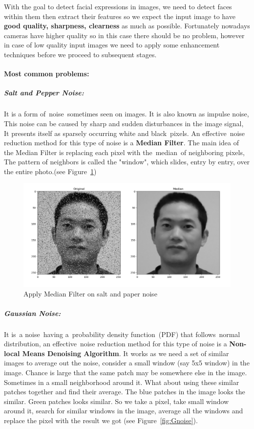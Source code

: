 With the goal to detect facial expressions in images, we need to detect faces within them then extract their features so we expect the input image to have \textbf{good quality, sharpness, clearness} as much as possible.\newline
Fortunately nowadays cameras have higher quality so in this case there should be no problem, however in case of low quality input images we need to apply some enhancement techniques before we proceed to subsequent stages.

\paragraph{Most common problems:}
\subparagraph{Salt and Pepper Noise:}
It is a form of noise sometimes seen on images. It is also known as impulse noise, This noise can be caused by sharp and sudden disturbances in the image signal, It presents itself as sparsely occurring white and black pixels.\newline
An effective noise reduction method for this type of noise is a \textbf{Median Filter}.\newline
The main idea of the Median Filter is  replacing each pixel with the median of neighboring pixels, The pattern of neighbors is called the "window", which slides, entry by entry, over the entire photo.(see Figure~\ref{fig:median})


\begin{figure}[H]
	\centering
	\includegraphics[width=.5\linewidth]{images/salt_pepper.jpg}
	\caption{Apply Median Filter on salt and paper noise}
	\label{fig:median}
\end{figure}

\subparagraph{Gaussian Noise:}
It is a noise having a probability density function (PDF) that follows normal distribution, an effective noise reduction method for this type of noise is a \textbf{Non-local Means Denoising Algorithm}.\newline
It works as we need a set of similar images to average out the noise, consider a small window (say 5x5 window) in the image. Chance is large that the same patch may be somewhere else in the image. Sometimes in a small neighborhood around it. What about using these similar patches together and find their average.\newline
The blue patches in the image looks the similar. Green patches looks similar. So we take a pixel, take small window around it, search for similar windows in the image, average all the windows and replace the pixel with the result we got (see Figure~\ref{fig:Gnoise}).\newline 

